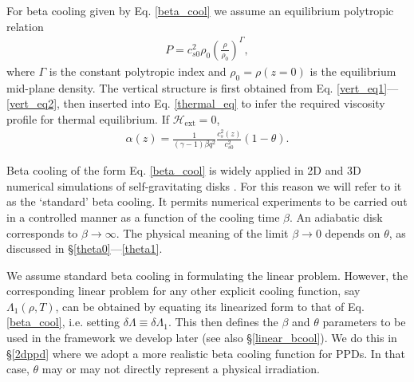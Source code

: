 For beta cooling given by Eq. \ref{beta_cool} we assume an 
equilibrium polytropic relation 
\begin{align}\label{poly_vert} 
  P  =
c_{s0}^2\rho_0\left(\frac{\rho}{\rho_0}\right)^\Gamma,
\end{align}
where $\Gamma$ is the constant polytropic index and $\rho_0 =
\rho(z=0)$ is the equilibrium mid-plane density. 
The vertical structure is first obtained from 
Eq. \ref{vert_eq1}---\ref{vert_eq2}, %
then inserted into 
Eq. \ref{thermal_eq} to infer the required viscosity profile for
thermal equilibrium. If  $\mathcal{H}_\mathrm{ext}=0$, 
\begin{align}\label{alpha_beta_relation}
\alpha(z) = \frac{1}{(\gamma-1)\beta
   q^2}\frac{c_s^2(z)}{c_{s0}^2}\left(1 - \theta\right). 
\end{align}

Beta cooling of the form Eq. \ref{beta_cool} is widely applied in 2D
and 3D numerical simulations of self-gravitating disks \citep{gammie01,
  rice05,rice11}. For this reason we will refer to it as the
`standard' beta cooling. It permits numerical experiments to be
carried out in a controlled manner as a function of the cooling time
$\beta$. An adiabatic disk corresponds to $\beta\to \infty$. The
physical meaning of the limit $\beta\to0$ depends on $\theta$, as
discussed in \S\ref{theta0}---\ref{theta1}.  


We assume standard beta cooling in formulating the linear
problem. However, the corresponding linear problem for  
any other explicit cooling function, say $\Lambda_1(\rho,T)$, can be  
obtained by equating its linearized form to 
that of Eq. \ref{beta_cool}, i.e. setting $\delta \Lambda \equiv
\delta \Lambda_1$. This then defines the $\beta$ and $\theta$
parameters to be used in the framework we develop later (see also 
\S\ref{linear_bcool}). We do this in \S\ref{2dppd} where we adopt a  
more realistic beta cooling function for PPDs. In that case, $\theta$ 
may or may not directly represent a physical irradiation.     

